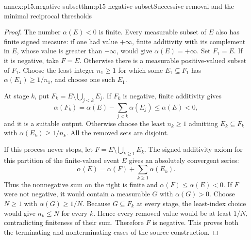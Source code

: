 \begin{annexitem}{annex:p15.negative-subset}{thm:p15-negative-subset}{Successive removal and the minimal reciprocal thresholds}
\begin{proof}
The number \(\alpha(E)<0\) is finite. Every measurable subset of \(E\)
also has finite signed measure: if one had value \(+\infty\), finite
additivity with its complement in \(E\), whose value is greater than
\(-\infty\), would give \(\alpha(E)=+\infty\).
Set \(F_1=E\). If it is negative, take \(F=E\).
Otherwise there is a measurable positive-valued subset of \(F_1\).
Choose the least integer \(n_1\geq1\) for which some
\(E_1\subseteq F_1\) has \(\alpha(E_1)\geq1/n_1\), and choose
one such \(E_1\).

At stage \(k\), put \(F_k=E\setminus\bigcup_{j<k}E_j\).
If \(F_k\) is negative, finite additivity gives
\[
                    \alpha(F_k)=\alpha(E)-\sum_{j<k}\alpha(E_j)
                                  \leq\alpha(E)<0,
\]
and it is a suitable output. Otherwise choose the least \(n_k\geq1\)
admitting \(E_k\subseteq F_k\) with \(\alpha(E_k)\geq1/n_k\).
All the removed sets are disjoint.

If this process never stops, let
\(F=E\setminus\bigcup_{k\geq1}E_k\).
The signed additivity axiom for this partition of the finite-valued
event \(E\) gives an absolutely convergent series:
\[
                         \alpha(E)=\alpha(F)+\sum_{k\geq1}\alpha(E_k).
\]
Thus the nonnegative sum on the right is finite and
\(\alpha(F)\leq\alpha(E)<0\).
If \(F\) were not negative, it would contain a measurable \(G\) with
\(\alpha(G)>0\). Choose \(N\geq1\) with \(\alpha(G)\geq1/N\).
Because \(G\subseteq F_k\) at every stage, the least-index choice
would give \(n_k\leq N\) for every \(k\). Hence every removed value
would be at least \(1/N\), contradicting finiteness of their sum.
Therefore \(F\) is negative. This proves both the terminating and
nonterminating cases of the source construction.
\end{proof}
\end{annexitem}

